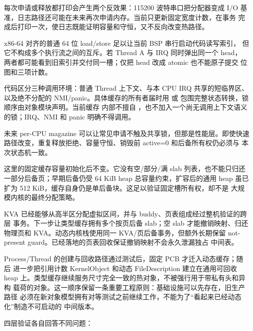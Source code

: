 每次申请或释放都打印会产生两个反效果：115200 波特串口把分配器变成 I/O
基准，日志路径还可能在未来再次申请内存。当前只更新固定宽度计数，在事务
完成后打印一次，使日志既能证明容量和守恒，又不反向改变热路径。

x86-64 对齐的普通 64 位 load/store 足以让当前 BSP 串行启动代码读写索引，
但它不构成多个执行流之间的互斥。若 Thread A 与 IRQ 同时弹出同一个 head，
两者都可能看到旧索引并交付同一槽；仅把 head 改成 atomic 也不能原子提交
位图和三项计数。

代码区分三种调用环境：普通 Thread 上下文、与本 CPU IRQ 共享的短临界区、
以及绝不分配的 NMI/panic。具体缓存的所有者届时用  或
 包围完整状态转换，锁顺序由对象模块声明。当前缓存
内部不擅自 ，也不加入一个尚无调用上下文语义的锁；IRQ、NMI 和
panic 明确不得调用。

未来 per-CPU magazine 可以让常见申请不触及共享锁，但那是性能层。即使快速
路径改变，重复释放拒绝、容量守恒、销毁前 active=0 和后备所有权仍必须与
本次状态机一致。

这里的固定缓存容量初始化后不变。它没有空/部分/满 slab 列表，也不能只归还
一部分后备页；早期后备仍受 64 KiB heap 总容量约束，扩容后的通用 heap
虽已扩为 512 KiB，缓存自身仍是单后备块。这足以验证固定槽所有权，却不是
大规模内核的最终分配策略。

KVA 已经能够从高半区分配虚拟区间，并与 buddy、页表组成经过整机验证的跨层
事务。下一步让类型缓存拥有多个按页后备 slab；空 slab 才能撤销映射、归还
物理页和 KVA。动态内核栈使用同一 KVA/页后备事务，但额外长期保留
not-present guard。已经落地的页表回收保证撤销映射不会永久泄漏独占
中间表。

Process/Thread 的创建与回收路径通过测试后，固定 PCB 才迁入动态缓存；随后
进一步把引用计数 KernelObject 和动态 FileDescription 建立在通用可回收
heap 上。类型缓存继续服务尺寸完全一致的热对象，不被强行用于带私有头和异构
载荷的对象。这一顺序保留一条重要工程原则：基础设施可以先存在，旧生产路径
必须在新对象模型拥有对等测试之前继续工作，不能为了“看起来已经动态化”制造不可启动的
中间版本。

四层验证各自回答不同问题：

